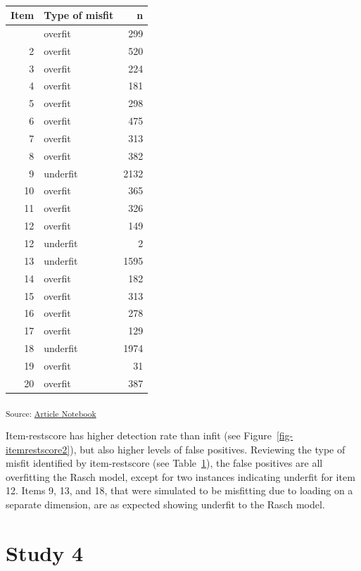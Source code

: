 \documentclass[
  letterpaper,
  DIV=11,
  numbers=noendperiod]{scrartcl}
\begin{document}
\begin{longtable}[]{@{}rlr@{}}

\caption{\label{tbl-overunder}}

\tabularnewline

\toprule\noalign{}
Item & Type of misfit & n \\
\midrule\noalign{}
\endhead
\bottomrule\noalign{}
\endlastfoot
1 & overfit & 299 \\
2 & overfit & 520 \\
3 & overfit & 224 \\
4 & overfit & 181 \\
5 & overfit & 298 \\
6 & overfit & 475 \\
7 & overfit & 313 \\
8 & overfit & 382 \\
9 & underfit & 2132 \\
10 & overfit & 365 \\
11 & overfit & 326 \\
12 & overfit & 149 \\
12 & underfit & 2 \\
13 & underfit & 1595 \\
14 & overfit & 182 \\
15 & overfit & 313 \\
16 & overfit & 278 \\
17 & overfit & 129 \\
18 & underfit & 1974 \\
19 & overfit & 31 \\
20 & overfit & 387 \\

\end{longtable}

\textsubscript{Source:
\href{https://pgmj.github.io/rasch_itemfit/index.qmd.html}{Article
Notebook}}

Item-restscore has higher detection rate than infit (see
Figure~\ref{fig-itemrestscore2}), but also higher levels of false
positives. Reviewing the type of misfit identified by item-restscore
(see Table~\ref{tbl-overunder}), the false positives are all overfitting
the Rasch model, except for two instances indicating underfit for item
12. Items 9, 13, and 18, that were simulated to be misfitting due to
loading on a separate dimension, are as expected showing underfit to the
Rasch model.

\section{Study 4}\label{study-4}
\end{document}
